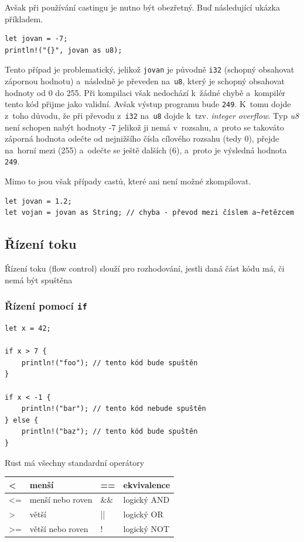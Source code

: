 \documentclass[a4paper, 12pt]{article} %
\newcommand{\rust}[1]{\texttt{#1}}
\begin{document}
            Avšak při používání castingu je nutno být obezřetný. Buď následující ukázka příkladem.
            \begin{verbatim}
let jovan = -7;
println!("{}", jovan as u8);
            \end{verbatim}
            
            Tento případ je problematický, jelikož \texttt{jovan} je původně \texttt{i32} (schopný obsahovat zápornou hodnotu) a~následně je převeden na~\texttt{u8}, který je schopný obsahovat hodnoty od 0 do 255. Při kompilaci však nedochází k~žádné chybě a~kompilér tento kód přijme jako validní. Avšak výstup programu bude \texttt{249}. K~tomu dojde z~toho důvodu, že při převodu z~\texttt{i32} na~\texttt{u8} dojde k~tzv. \textit{integer overflow}. Typ \textit{u8} není schopen nabýt hodnoty -7 jelikož ji nemá v~rozsahu, a~proto se takováto záporná hodnota odečte od nejnižšího čísla cílového rozsahu (tedy 0), přejde na~horní mezi (255) a~odečte se ještě dalších (6), a~proto je výsledná hodnota \texttt{249}.
            
            Mimo to jsou však případy castů, které ani není možné zkompilovat.
            \begin{verbatim}
let jovan = 1.2;
let vojan = jovan as String; // chyba - převod mezi číslem a~řetězcem
            \end{verbatim}

    \subsection{Řízení toku}
        Řízení toku (flow control) slouží pro rozhodování, jestli daná část kódu má, či nemá být spuštěna
    
    \subsubsection*{Řízení pomocí \rust{if}}
        \begin{verbatim}
let x = 42;

if x > 7 {
    println!("foo"); // tento kód bude spuštěn
}

if x < -1 {
    println!("bar"); // tento kód nebude spuštěn
} else {
    println!("baz"); // tento kód bude spuštěn
}
        \end{verbatim}
        
        Rust má všechny standardní operátory
            \begin{table}[h!]
                \centering
                \begin{tabular}{ll|ll}
                    \hline
                    \textless{} & menší & == & ekvivalence \\ \hline
                    \textless{}= & menší nebo roven & \&\& & logický AND \\ \hline
                    \textgreater{} & větší & || & logický OR \\ \hline
                    \textgreater{}= & větší nebo roven & ! & logický NOT \\ \hline
                \end{tabular}
            \end{table}
        
\end{document}

